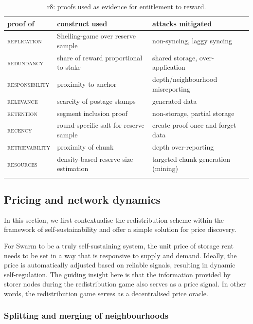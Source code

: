 {\small \begin{longtable}{l|p{}|p{}}
\toprule
 {proof of} & {construct used} & {attacks mitigated}\\\midrule
 \textsc{replication}& Shelling-game over reserve sample& non-syncing, laggy syncing\\
 \textsc{redundancy}& share of reward proportional to stake & shared storage, over-application\\
 \textsc{responsibility}& proximity to anchor & depth/neighbourhood misreporting \\
 \textsc{relevance}& scarcity of postage stamps & generated data \\
 \textsc{retention}& segment inclusion proof & non-storage, partial storage\\
 \textsc{recency}& round-specific salt for reserve sample & create proof once and forget data\\
 \textsc{retrievability}& proximity of chunk & depth over-reporting\\ 
 \textsc{resources}& density-based reserve size estimation & targeted chunk generation (mining) \\\bottomrule
  \caption[r8: proofs used as evidence for entitlement to reward]{r8: proofs used as evidence for entitlement to reward.}
\label{tab:gr8}
 \end{longtable}
 }


\subsection{Pricing and network dynamics}\label{sec:price-oracle}

In this section, we first contextualise the redistribution scheme within the framework of self-sustainability and offer a simple solution for price discovery.

For Swarm to be a truly self-sustaining system, the unit price of storage rent needs to be set in a way that is responsive to supply and demand. Ideally, the price is automatically adjusted based on reliable signals, resulting in dynamic self-regulation. The guiding insight here is that the information provided by storer nodes during the redistribution game also serves as a price signal. In other words, the redistribution game serves as a decentralised price oracle.



\subsubsection{Splitting and merging of neighbourhoods}

